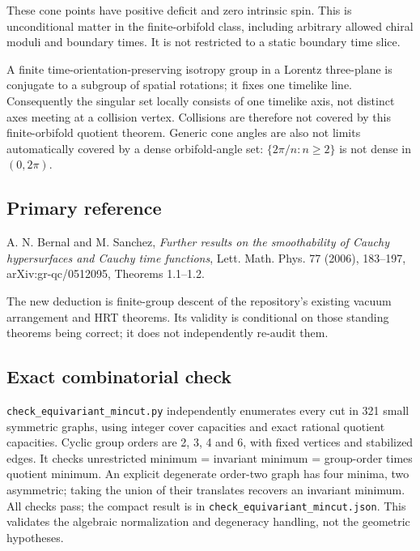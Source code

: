 \documentclass[11pt]{article}
\begin{document}
These cone points have positive deficit and zero intrinsic spin. This is
unconditional matter in the finite-orbifold class, including arbitrary
allowed chiral moduli and boundary times. It is not restricted to a
static boundary time slice.

A finite time-orientation-preserving isotropy group in a Lorentz
three-plane is conjugate to a subgroup of spatial rotations; it fixes
one timelike line. Consequently the singular set locally consists of one
timelike axis, not distinct axes meeting at a collision vertex.
Collisions are therefore not covered by this finite-orbifold quotient
theorem. Generic cone angles are also not limits automatically covered
by a dense orbifold-angle set: \(\{2\pi/n:n\ge2\}\) is not dense in
\((0,2\pi)\).

\subsection{Primary reference}\label{primary-reference}

A. N. Bernal and M. Sanchez, \emph{Further results on the smoothability
of Cauchy hypersurfaces and Cauchy time functions}, Lett. Math. Phys. 77
(2006), 183--197, arXiv:gr-qc/0512095, Theorems 1.1--1.2.

The new deduction is finite-group descent of the repository's existing
vacuum arrangement and HRT theorems. Its validity is conditional on
those standing theorems being correct; it does not independently
re-audit them.

\subsection{Exact combinatorial check}\label{exact-combinatorial-check}

\texttt{check\_\allowbreak equivariant\_\allowbreak mincut.py} independently enumerates every
cut in 321 small symmetric graphs, using integer cover capacities and
exact rational quotient capacities. Cyclic group orders are 2, 3, 4 and
6, with fixed vertices and stabilized edges. It checks unrestricted
minimum = invariant minimum = group-order times quotient minimum. An
explicit degenerate order-two graph has four minima, two asymmetric;
taking the union of their translates recovers an invariant minimum. All
checks pass; the compact result is in
\texttt{check\_\allowbreak equivariant\_\allowbreak mincut.json}. This validates the algebraic
normalization and degeneracy handling, not the geometric hypotheses.
\end{document}
